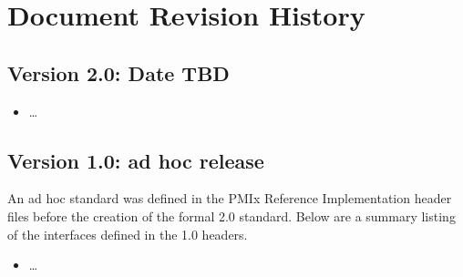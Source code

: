 \chapter{Document Revision History}
\label{chap:history}

\section{Version 2.0: Date TBD}

\begin{itemize}
\item \ldots
\end{itemize}


\section{Version 1.0: ad hoc release}

\par
An ad hoc standard was defined in the \ac{PMIx} Reference Implementation header files before the creation of the formal 2.0 standard.
Below are a summary listing of the interfaces defined in the 1.0 headers.

\begin{itemize}
\item \ldots
\end{itemize}
